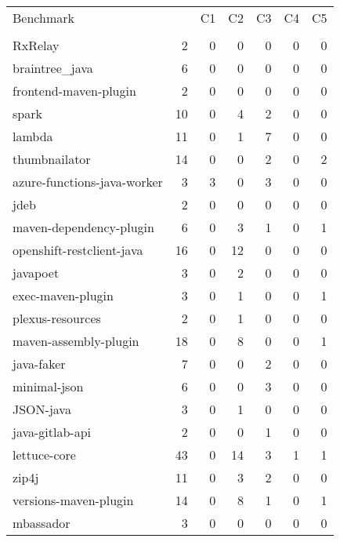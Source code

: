 \begin{table}[h]
    \begin{tabular}{lrrrrrr}
        Benchmark                   &  & C1 & C2 & C3 & C4 & C5 \\ 
         & & & & & & \\ \hline
        RxRelay                     & 2                 & 0  & 0  & 0  & 0  & 0  \\
        braintree\_java             & 6                 & 0  & 0  & 0  & 0  & 0  \\
        frontend-maven-plugin       & 2                 & 0  & 0  & 0  & 0  & 0  \\
        spark                       & 10                & 0  & 4  & 2  & 0  & 0  \\
        lambda                      & 11                & 0  & 1  & 7  & 0  & 0  \\
        thumbnailator               & 14                & 0  & 0  & 2  & 0  & 2  \\
        azure-functions-java-worker & 3                 & 3  & 0  & 3  & 0  & 0  \\
        jdeb                        & 2                 & 0  & 0  & 0  & 0  & 0  \\
        maven-dependency-plugin     & 6                 & 0  & 3  & 1  & 0  & 1  \\
        openshift-restclient-java   & 16                & 0  & 12 & 0  & 0  & 0  \\
        javapoet                    & 3                 & 0  & 2  & 0  & 0  & 0  \\
        exec-maven-plugin           & 3                 & 0  & 1  & 0  & 0  & 1  \\
        plexus-resources            & 2                 & 0  & 1  & 0  & 0  & 0  \\
        maven-assembly-plugin       & 18                & 0  & 8  & 0  & 0  & 1  \\
        java-faker                  & 7                 & 0  & 0  & 2  & 0  & 0  \\
        minimal-json                & 6                 & 0  & 0  & 3  & 0  & 0  \\
        JSON-java                   & 3                 & 0  & 1  & 0  & 0  & 0  \\
        java-gitlab-api             & 2                 & 0  & 0  & 1  & 0  & 0  \\
        lettuce-core                & 43                & 0  & 14 & 3  & 1  & 1  \\
        zip4j                       & 11                & 0  & 3  & 2  & 0  & 0  \\
        versions-maven-plugin       & 14                & 0  & 8  & 1  & 0  & 1  \\
        mbassador                   & 3                 & 0  & 0  & 0  & 0  & 0
    \end{tabular}
\end{table}
